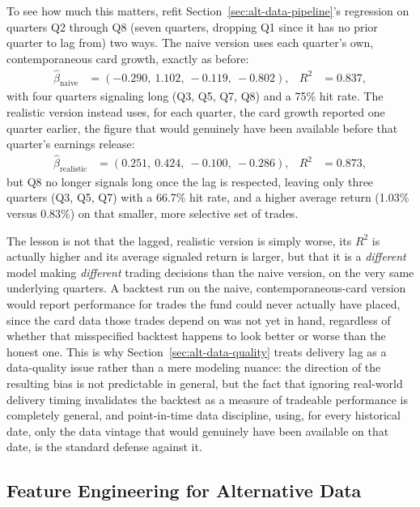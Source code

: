 \documentclass[../ai_in_finance]{subfiles}
\begin{document}
To see how much this matters, refit Section~\ref{sec:alt-data-pipeline}'s regression on quarters Q2 through Q8 (seven quarters, dropping Q1 since it has no prior quarter to lag from) two ways. The naive version uses each quarter's own, contemporaneous card growth, exactly as before:
\begin{align*}
\hat\beta_{\text{naive}} &= (-0.290,\ 1.102,\ -0.119,\ -0.802), & R^2 &= 0.837,
\end{align*}
with four quarters signaling long (Q3, Q5, Q7, Q8) and a 75\% hit rate. The realistic version instead uses, for each quarter, the card growth reported one quarter earlier, the figure that would genuinely have been available before that quarter's earnings release:
\begin{align*}
\hat\beta_{\text{realistic}} &= (0.251,\ 0.424,\ -0.100,\ -0.286), & R^2 &= 0.873,
\end{align*}
but Q8 no longer signals long once the lag is respected, leaving only three quarters (Q3, Q5, Q7) with a 66.7\% hit rate, and a higher average return (1.03\% versus 0.83\%) on that smaller, more selective set of trades.

The lesson is not that the lagged, realistic version is simply worse, its $R^2$ is actually higher and its average signaled return is larger, but that it is a \emph{different} model making \emph{different} trading decisions than the naive version, on the very same underlying quarters. A backtest run on the naive, contemporaneous-card version would report performance for trades the fund could never actually have placed, since the card data those trades depend on was not yet in hand, regardless of whether that misspecified backtest happens to look better or worse than the honest one. This is why Section~\ref{sec:alt-data-quality} treats delivery lag as a data-quality issue rather than a mere modeling nuance: the direction of the resulting bias is not predictable in general, but the fact that ignoring real-world delivery timing invalidates the backtest as a measure of tradeable performance is completely general, and point-in-time data discipline, using, for every historical date, only the data vintage that would genuinely have been available on that date, is the standard defense against it.

\subsection{Feature Engineering for Alternative Data}
\label{sec:altdata-feature-engineering}
\end{document}
